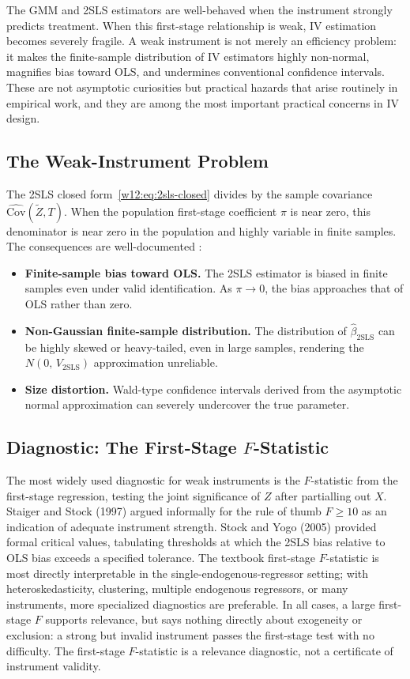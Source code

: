 \documentclass[master.tex]{subfiles}
\begin{document}
The GMM and 2SLS estimators are well-behaved when the instrument
strongly predicts treatment.  When this first-stage relationship is
weak, IV estimation becomes severely fragile.  A weak instrument is
not merely an efficiency problem: it makes the finite-sample
distribution of IV estimators highly non-normal, magnifies bias
toward OLS, and undermines conventional confidence intervals.  These
are not asymptotic curiosities but practical hazards that arise
routinely in empirical work, and they are among the most important
practical concerns in IV design.

\subsection{The Weak-Instrument Problem}

The 2SLS closed form~\eqref{w12:eq:2sls-closed} divides by the
sample covariance $\widehat{\mathrm{Cov}}(\tilde{Z}, T)$.  When the
population first-stage coefficient $\pi$ is near zero, this denominator
is near zero in the population and highly variable in finite samples.
The consequences are well-documented
\citep{bound1995problems}:
\begin{itemize}
  \item \textbf{Finite-sample bias toward OLS.}  The 2SLS estimator is
    biased in finite samples even under valid identification.  As
    $\pi \to 0$, the bias approaches that of OLS rather than zero.
  \item \textbf{Non-Gaussian finite-sample distribution.}  The
    distribution of $\hat\beta_{\mathrm{2SLS}}$ can be highly skewed
    or heavy-tailed, even in large samples, rendering the
    $N(0,\,V_{\mathrm{2SLS}})$ approximation unreliable.
  \item \textbf{Size distortion.}  Wald-type confidence intervals
    derived from the asymptotic normal approximation can severely
    undercover the true parameter.
\end{itemize}

\subsection{Diagnostic: The First-Stage $F$-Statistic}

The most widely used diagnostic for weak instruments is the
$F$-statistic from the first-stage regression, testing the joint
significance of $Z$ after partialling out $X$.  Staiger and Stock
(1997) argued informally for the rule of thumb $F \geq 10$ as an
indication of adequate instrument strength.  Stock and Yogo (2005)
provided formal critical values, tabulating thresholds at which
the 2SLS bias relative to OLS bias exceeds a specified tolerance.
The textbook first-stage $F$-statistic is most directly
interpretable in the single-endogenous-regressor setting; with
heteroskedasticity, clustering, multiple endogenous regressors, or
many instruments, more specialized diagnostics are preferable.
In all cases, a large first-stage $F$ supports relevance, but says
nothing directly about exogeneity or exclusion: a strong but invalid
instrument passes the first-stage test with no difficulty.  The
first-stage $F$-statistic is a relevance diagnostic, not a
certificate of instrument validity.
\end{document}
